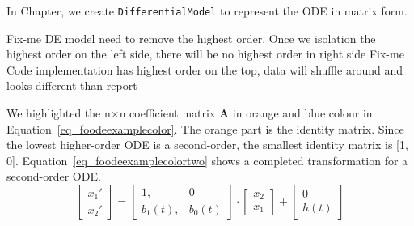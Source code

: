 In Chapter, we create \verb|DifferentialModel| to represent the ODE in matrix form. 

Fix-me DE model need to remove the highest order. Once we isolation the highest order on the left side, there will be no highest order in right side
Fix-me Code implementation has highest order on the top, data will shuffle around and looks different than report


We highlighted the n$\times$n coefficient matrix \textbf{A} in orange and blue colour in Equation~\ref{eq_foodeexamplecolor}. The orange part is the identity matrix. Since the lowest higher-order ODE is a second-order, the smallest identity matrix is [1, 0]. Equation~\ref{eq_foodeexamplecolortwo} shows a completed transformation for a second-order ODE.
\begin{equation} \label{eq_foodeexamplecolortwo}
	\begin{bmatrix}
		{x_{1}'} \\
    {x_{2}'} 
	\end{bmatrix}
    = 
  \begin{bmatrix}
		{1}, & {0} \\
    {b_{1}(t)}, & {b_{0}(t)}
	\end{bmatrix}
    \cdot
  \begin{bmatrix}
		{x_{2}} \\
    {x_{1}} 
	\end{bmatrix}
    + 
  \begin{bmatrix}
    {0} \\
    {h(t)}
	\end{bmatrix}
\end{equation}

